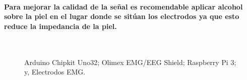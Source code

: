 \documentclass{article}
\begin{document}
\paragraph{
Para mejorar la calidad de la señal es recomendable aplicar alcohol sobre la piel en el lugar donde se sitúan los electrodos ya que esto reduce la impedancia de la piel.
}

\begin{figure}%
\centering
{}%
\hspace{8pt}%
 \\
%
\hspace{8pt}%
%
\caption[]{
 Arduino Chipkit Uno32;
 Olimex EMG/EEG Shield;
 Raspberry Pi 3; y,
 Electrodos EMG.}%
\label{fig:ex3}%
\end{figure}
\end{document}
